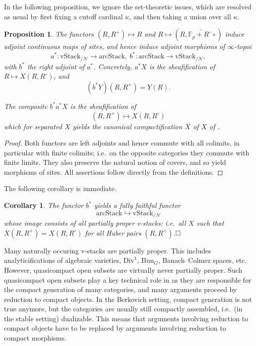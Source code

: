 \documentclass[11pt]{amsart}
\numberwithin{equation}{section}
\numberwithin{theorem}{section}
\newtheorem{corollary}[theorem]{Corollary}
\newtheorem{proposition}[theorem]{Proposition}
\theoremstyle{definition}
\begin{document}
In the following proposition, we ignore the set-theoretic issues, which are resolved as usual by first fixing a cutoff cardinal $\kappa$, and then taking a union over all $\kappa$.

\begin{proposition} The functors $(R,R^+)\mapsto R$ and $R\mapsto (R,\widetilde{\mathbb F_p+R^\circ\circ})$ induce adjoint continuous maps of sites, and hence induce adjoint morphisms of $\infty$-topoi
\[
a^\ast: \mathrm{vStack}_{/\mathcal N}\to \mathrm{arcStack},\ b^\ast: \mathrm{arcStack}\to \mathrm{vStack}_{/\mathcal N},
\]
with $b^\ast$ the right adjoint of $a^\ast$. Concretely, $a^\ast X$ is the sheafification of $R\mapsto X(R,R^\circ)$, and
\[
(b^\ast Y)(R,R^+)= Y(R).
\]

The composite $b^\ast a^\ast X$ is the sheafification of
\[
(R,R^+)\mapsto X(R,R^\circ)
\]
which for separated $X$ yields the canonical compactification $\overline{X}$ of $X$ of \cite[Proposition 18.6]{ECoD}.
\end{proposition}

\begin{proof} Both functors are left adjoints and hence commute with all colimits, in particular with finite colimits; i.e.~on the opposite categories they commute with finite limits. They also preserve the natural notion of covers, and so yield morphisms of sites. All assertions follow directly from the definitions.
\end{proof}

The following corollary is immediate.

\begin{corollary} The functor $b^\ast$ yields a fully faithful functor
\[
\mathrm{arcStack}\hookrightarrow \mathrm{vStack}_{/\mathcal N}
\]
whose image consists of all partially proper v-stacks; i.e.~all $X$ such that $X(R,R^+)=X(R,R^\circ)$ for all Huber pairs $(R,R^+)$.$\hfill \Box$
\end{corollary}

Many naturally occuring v-stacks are partially proper. This includes analyticifications of algebraic varieties, $\mathrm{Div}^1$, $\mathrm{Bun}_G$, Banach--Colmez spaces, etc. However, quasicompact open subsets are virtually never partially proper. Such quasicompact open subsets play a key technical role in \cite{ECoD} as they are responsible for the compact generation of many categories, and many arguments proceed by reduction to compact objects. In the Berkovich setting, compact generation is not true anymore, but the categories are usually still compactly assembled, i.e.~(in the stable setting) dualizable. This means that arguments involving reduction to compact objects have to be replaced by arguments involving reduction to compact morphisms.
\end{document}
